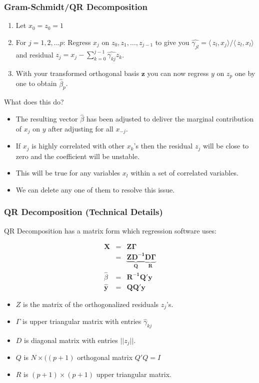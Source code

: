 \documentclass[xcolor=pdftex,dvipsnames,table,mathserif,aspectratio=169]{beamer}
\begin{document}
\begin{frame}
\frametitle{Gram-Schmidt/QR Decomposition}
\begin{enumerate}
\item Let $x_0 = z_0 = 1$
\item For $j = 1,2,\ldots p$: Regress $x_j$ on $z_0,z_1,\ldots,z_{j-1}$  to give you $\hat{\gamma_{jl}} = \langle\, z_l, x_j \rangle/\langle\, z_l, x_l \rangle$ and residual $z_j = x_j  - \sum_{k=0}^{j-1} \hat{\gamma_{kj}} z_k$.
\item With your transformed orthogonal basis $\mathbf{z}$ you can now regress $y$ on $z_p$ one by one to obtain $\hat{\beta}_p$.
\end{enumerate}
What does this do?
\begin{itemize}
\item The resulting vector $\hat{\beta}$ has been adjusted to deliver the marginal contribution of $x_j$ on $y$ after adjusting for all $x_{-j}$.
\item If $x_j$ is highly correlated with other $x_k$'s then the residual $z_j$ will be close to zero and the coefficient will be unstable.
\item This will be true for any variables $x_l$ within a set of correlated variables.
\item We can delete any one of them to resolve this issue.
\end{itemize}
\end{frame}


\begin{frame}
\frametitle{QR Decomposition (Technical Details)}
QR Decomposition has a matrix form which regression software uses:

\begin{eqnarray*}
\mathbf{X} &=& \mathbf{Z \Gamma} \\
    &=& \mathbf{\underbrace{Z D^{-1}}_{Q} \underbrace{D \Gamma}_{R}} \\
    \hat{\beta} &=& \mathbf{R^{-1} Q' y}\\
    \hat{\mathbf{y}} &=& \mathbf{Q Q'} \mathbf{y}
\end{eqnarray*}
\begin{itemize}
\item $Z$ is the matrix of the orthogonalized residuals $z_j$'s.
\item $\Gamma$ is upper triangular matrix with entries $\hat{\gamma}_{kj}$
\item $D$ is diagonal matrix with entries $|| z_j ||$.
\item $Q$ is $N \times ((p+1)$ orthogonal  matrix $Q'Q = I$ 
\item $R$ is $(p+1) \times (p+1)$ upper triangular matrix.
\end{itemize}
\end{frame}
\end{document}
